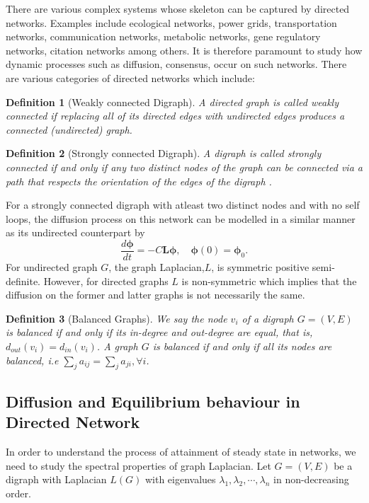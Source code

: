 \documentclass[10pt,a4paper]{article}
\newtheorem{defn}{Definition}
\begin{document}
        There are various complex systems whose skeleton can be captured by directed networks. Examples include ecological  networks, power grids, transportation networks, communication networks, metabolic networks, gene regulatory networks, citation networks among others. It is therefore paramount to study how dynamic processes such as diffusion, consensus, occur on such networks. There are various categories of directed networks which include:
        \begin{defn}[Weakly connected Digraph]
        	A directed graph is called weakly connected if replacing all of its directed edges with undirected edges produces a connected (undirected) graph.
          \end{defn}   
        \begin{defn}[Strongly connected Digraph]
        	A digraph is called strongly connected if and only if any two distinct nodes of the graph can be connected via a path that respects the orientation of the edges of the digraph \citep{saber2003agreement}.
        \end{defn}        
        For a strongly connected digraph with atleast two distinct nodes and with no self loops, the diffusion process on this network can be modelled in a similar manner as its undirected counterpart by 
        \begin{equation}
        \frac{d\boldsymbol{\phi}}{dt} = -C\mathbf{L}\boldsymbol{\phi}, \quad \boldsymbol{\phi}(0) = \boldsymbol{\phi}_0.
        \end{equation}
        For undirected graph $G$, the graph Laplacian,$L$, is symmetric positive semi-definite. However, for directed graphs $L$ is non-symmetric which implies that the diffusion on the former and latter graphs is not necessarily the same.
        
         \begin{defn}[Balanced Graphs]
        	We say the node $v_i$ of a digraph $G=(V,E)$ is balanced if and only if its in-degree and out-degree are equal, that is, $d_{out}(v_i) =d_{in}(v_i)$. A graph $G$ is balanced if and only if all its nodes are balanced, i.e $\sum_j a_{ij} = \sum_j a_{ji}, \forall i$. 
        \end{defn}
        
        \subsection{Diffusion and Equilibrium behaviour in Directed Network}
        In order to understand the process of attainment of steady state in networks, we need to study the spectral properties of graph Laplacian. Let $G=(V,E)$ be a digraph with Laplacian $L(G)$ with eigenvalues $\lambda_1, \lambda_2, \cdots, \lambda_n$ in non-decreasing order. 
\end{document}

